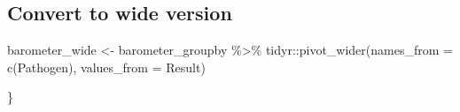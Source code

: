 \documentclass[
]{article}
\newenvironment{Shaded}{\begin{snugshade}}{\end{snugshade}}
\newcommand{\AttributeTok}[1]{\textcolor[rgb]{0.77,0.63,0.00}{#1}}
\newcommand{\FunctionTok}[1]{\textcolor[rgb]{0.00,0.00,0.00}{#1}}
\newcommand{\NormalTok}[1]{#1}
\newcommand{\OtherTok}[1]{\textcolor[rgb]{0.56,0.35,0.01}{#1}}
\newcommand{\SpecialCharTok}[1]{\textcolor[rgb]{0.00,0.00,0.00}{#1}}
\begin{document}
\hypertarget{convert-to-wide-version}{%
\subsection{Convert to wide version}\label{convert-to-wide-version}}

\begin{Shaded}
\begin{Highlighting}[]
\NormalTok{barometer\_wide }\OtherTok{\textless{}{-}}\NormalTok{ barometer\_groupby }\SpecialCharTok{\%\textgreater{}\%}
\NormalTok{  tidyr}\SpecialCharTok{::}\FunctionTok{pivot\_wider}\NormalTok{(}\AttributeTok{names\_from =} \FunctionTok{c}\NormalTok{(Pathogen), }\AttributeTok{values\_from =}\NormalTok{ Result) }
\end{Highlighting}
\end{Shaded}

\}
\end{document}
